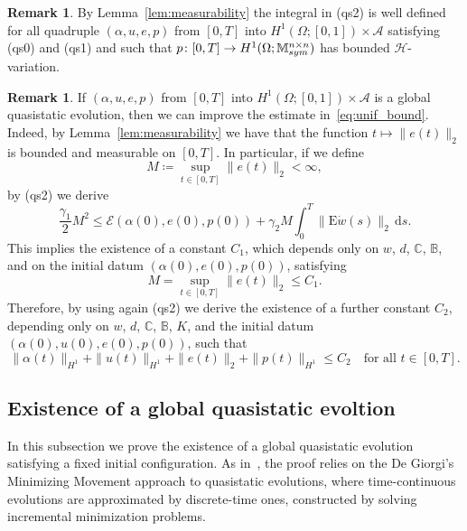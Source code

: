 \documentclass[reqno]{amsart}
\theoremstyle{definition}
\newtheorem{remark}[corollary]{Remark}
\numberwithin{equation}{section}
\def\de {\mathrm{d}}
\def\M {\mathbb M^{n\times n}_{\rm sym}}
\def\C {\mathbb C}
\def\B {\mathbb B}
\def\EE {\mathrm{E}}
\begin{document}
\begin{remark}
By Lemma~\ref{lem:measurability} the integral in (qs2) is well defined for all quadruple $(\alpha,u,e,p)$ from $[0,T]$ into $H^1(\Omega;[0,1])\times\mathcal A$ satisfying (qs0) and (qs1) and such that $p\colon [0,T]\to H^1(\Omega;\M)$ has bounded $\mathcal H$-variation. 
\end{remark}

\begin{remark}\label{rem:unif_bound}
If $(\alpha,u,e,p)$ from $[0,T]$ into $H^1(\Omega;[0,1])\times \mathcal A$ is a global quasistatic evolution, then we can improve the estimate in~\eqref{eq:unif_bound}. Indeed, by Lemma~\ref{lem:measurability} we have that the function $t\mapsto \|e(t)\|_2$ is bounded and measurable on $[0,T]$. In particular, if we define 
$$M\coloneqq\sup_{t\in[0,T]}\|e(t)\|_2<\infty,$$
by (qs2) we derive
$$\frac{\gamma_1}{2}M^2\le \mathcal E(\alpha(0),e(0),p(0))+\gamma_2 M\int_0^T\|\EE \dot w(s)\|_2\,\de s.$$
This implies the existence of a constant $C_1$, which depends only on $w$, $d$, $\C$, $\B$, and on the initial datum $(\alpha(0),e(0),p(0))$, satisfying
$$M=\sup_{t\in[0,T]}\|e(t)\|_2\le C_1.$$
Therefore, by using again (qs2) we derive the existence of a further constant $C_2$, depending only on $w$, $d$, $\C$, $\B$, $K$, and the initial datum $(\alpha(0),u(0),e(0),p(0))$, such that
\begin{equation*}
\|\alpha(t)\|_{H^1}+\|u(t)\|_{H^1}+\|e(t)\|_2+\|p(t)\|_{H^1}\le C_2\quad\text{for all $t\in[0,T]$}.
\end{equation*}     
\end{remark}

\subsection{Existence of a global quasistatic evoltion}

In this subsection we prove the existence of a global quasistatic evolution satisfying a fixed initial configuration. As in~\cite{Cr3}, the proof relies on the De Giorgi’s Minimizing Movement approach to quasistatic evolutions, where time-continuous evolutions are approximated by discrete-time ones, constructed by solving incremental minimization problems.
\end{document}

